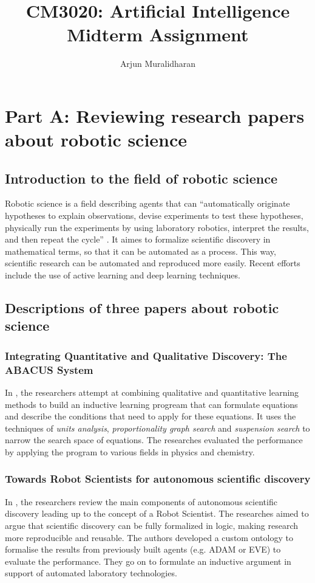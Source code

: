 \title{CM3020: Artificial Intelligence \\ Midterm Assignment}
\author{Arjun Muralidharan}



\section{Part A: Reviewing research papers about robotic science}

\subsection{Introduction to the field of robotic science}
Robotic science is a field describing agents that can ``automatically originate hypotheses to explain observations, devise experiments to test these hypotheses, physically run the experiments by using laboratory robotics, interpret the results, and then repeat the cycle'' \cite{king_automation_2009}. It aimes to formalize scientific discovery in mathematical terms, so that it can be automated as a process. This way, scientific research can be automated and reproduced more easily. Recent efforts include the use of active learning and deep learning techniques.

\subsection{Descriptions of three papers about robotic science}

\subsubsection{Integrating Quantitative and Qualitative Discovery: The ABACUS System}
In \cite{falkenhainer_integrating_1986}, the researchers attempt at combining qualitative and quantitative learning methods to build an inductive learning progream that can formulate equations and describe the conditions that need to apply for these equations. It uses the techniques of \textit{units analysis}, \textit{proportionality graph search} and \textit{suspension search} to narrow the search space of equations. The researches evaluated the performance by applying the program to various fields in physics and chemistry.

\subsubsection{Towards Robot Scientists for autonomous scientific discovery}
In \cite{sparkes_towards_2010}, the researchers review the main components of autonomous scientific discovery leading up to the concept of a Robot Scientist. The researches aimed to argue that scientific discovery can be fully formalized in logic, making research more reproducible and reusable. The authors developed a custom ontology to formalise the results from previously built agents (e.g. ADAM or EVE) to evaluate the performance. They go on to formulate an inductive argument in support of automated laboratory technologies.

